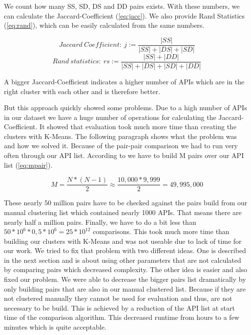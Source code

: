 \documentclass[a4paper]{IEEEtran}
\begin{document}
We count how many SS, SD, DS and DD pairs exists. With these numbers, we can calculate the Jaccard-Coefficient (\ref{eq:jacc}). We also provide Rand Statistics (\ref{eq:rand}), which can be easily calculated from the same numbers.

\begin{equation}
\label{eq:jacc}
Jaccard~Coefficient:~ j:= \frac{|SS|}{|SS|+|DS|+|SD|}
\end{equation}
\begin{equation}
\label{eq:rand}
Rand~statistics:~ rs:= \frac{|SS|+|DD|}{|SS|+|DS|+|SD|+|DD|}
\end{equation}
\vspace{5mm}

A bigger Jaccard-Coefficient indicates a higher number of APIs which are in the right cluster with each other and is therefore better.

But this approach quickly showed some problems. Due to a high number of APIs in our dataset we have a huge number of operations for calculating the Jaccard-Coefficient. It showed that evaluation took much more time than creating the clusters with K-Means. The following paragraph shows what the problem was and how we solved it.
Because of the pair-pair comparison we had to run very often through our API list. According to \cite{halkidi2002cluster} we have to build M pairs over our API list (\ref{eq:mpair}).

\begin{equation}
\label{eq:mpair}
M= \frac{N*(N-1)}{2}\approx \frac{10,000*9,999}{2}=49,995,000
\end{equation}

These nearly 50 million pairs have to be checked against the pairs build from our manual clustering list which contained nearly 1000 APIs. That means there are  nearly half a million pairs. Finally, we have to do a bit less than $50*10^6*0,5*10^6=25*10^{12}$ comparisons. This took much more time than building our clusters with K-Means and was not useable due to lack of time for our work.
We tried to fix that problem with two different ideas. One is described in the next section and is about using other parameters that are not calculated by comparing pairs which decreased complexity. The other idea is easier and also fixed our problem. We were able to decrease the bigger pairs list dramatically by only building pairs that are also in our manual clustered list. Because if they are not clustered manually they cannot be used for evaluation and thus, are not necessary to be build. This is achieved by a reduction of the API list at start time of the comparison algorithm. This decreased runtime from hours to a few minutes which is quite acceptable.
\end{document}
